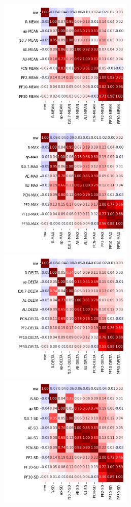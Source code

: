 \documentclass[12pt]{article}
\begin{document}
\newpage

\begin{figure}
   \includegraphics[width=0.57\textwidth]{seven-eight_mean_3.png}
   \includegraphics[width=0.57\textwidth]{seven-eight_max_3.png}
   \includegraphics[width=0.57\textwidth]{seven-eight_delta_3.png}
   \includegraphics[width=0.57\textwidth]{seven-eight_sd_3.png}
\end{figure}
\end{document}

